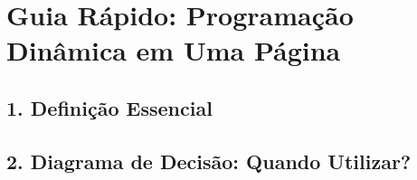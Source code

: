 
\section*{Guia Rápido: Programação Dinâmica em Uma Página}

\subsection*{1. Definição Essencial}
\noindent{}

\vspace{0.5cm}

\subsection*{2. Diagrama de Decisão: Quando Utilizar?}

